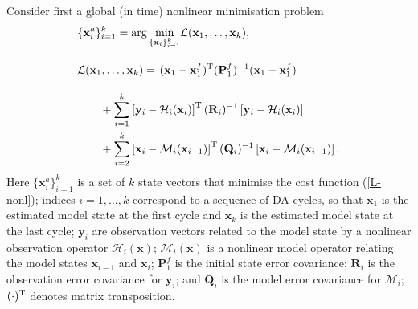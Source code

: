 \documentclass[11pt]{report}
\newcommand{\mb} {\mathbf}
\newcommand{\T}{^{\tiny \mathrm T}}
\begin{document}
Consider first a global (in time) nonlinear minimisation problem
\begin{align}
  \label{min-nonl}
  &\{\mb x_i^a\}_{i=1}^k = \arg \underset{\{\mb x_i\}_{i = 1}^k}\min \mathcal L(\mb x_1, \dots, \mb x_k),\\
  \nonumber
  &\mathcal L(\mb x_1, \dots, \mb x_k)  = \left . (\mb x_1 - \mb x_1^f)\T (\mb P_1^f)^{-1} (\mb x_1 - \mb x_1^f) 
  \vphantom{\sum_{i = 2}^{k}}
  \right . \\
  \nonumber
  & \qquad + \sum_{i = 1}^k \left [ \mb y_i - \mathcal H_i(\mb x_i) \right ] \T (\mb R_i)^{-1} \left [ \mb y_i - \mathcal H_i(\mb x_i) \right ] \\ 
  & \qquad + \sum_{i = 2}^{k} \left [ \mb x_i - \mathcal M_i(\mb x_{i-1}) \right ]\T (\mb Q_i)^{-1} \left [ \mb x_i - \mathcal M_i(\mb x_{i-1}) \right ].
  \label{L-nonl}
\end{align}
Here $\{\mb x_i^a\}_{i=1}^k$ is a set of $k$ state vectors that minimise the cost function (\ref{L-nonl}); indices $i = 1,\dots,k$ correspond to a sequence of DA cycles, so that $\mb x_1$ is the estimated model state at the first cycle and $\mb x_k$ is the estimated model state at the last cycle; $\mb y_i$ are observation vectors related to the model state by a nonlinear observation operator $\mathcal H_i(\mb x)$; $\mathcal M_i(\mb x)$ is a nonlinear model operator relating the model states $\mb x_{i - 1}$ and $\mb x_i$; $\mb P_1^f$ is the initial state error covariance; $\mb R_i$ is the observation error covariance for $\mb y_i$; and $\mb Q_i$ is the model error covariance for $\mathcal M_i$; $(\cdot)\T$ denotes matrix transposition.
\end{document}
